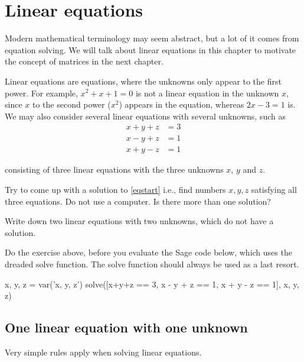 \documentclass{article}
\begin{document}
\chapter{Linear equations}

Modern mathematical terminology may seem abstract, but a lot of it comes from
equation solving. We will talk about linear equations in this chapter to
motivate the concept of matrices in the next chapter.

Linear equations are equations, where the unknowns
only appear to the first power. For example,
$x^2 + x + 1 = 0$ is not a linear equation in the unknown $x$, since $x$ to the second power ($x^2$) appears in the equation,  whereas
$2 x - 3 = 1$ is.
We may also consider several linear equations with several unknowns, such as
\begin{align}
x + y + z &= 3\\
x - y + z &= 1\\ \label{eqstart}
x + y - z &= 1
\end{align}

consisting of three linear equations with the three unknowns $x$, $y$ and $z$.

\beginshex
Try to come up with a solution to \eqref{eqstart} i.e., find
numbers $x, y, z$ satisfying all three equations. Do not use a computer.
Is there more than one solution?

Write down two linear equations with two unknowns, which do not
have a solution.
\endshex

Do the exercise above, before you evaluate the Sage code below, which uses
the dreaded solve function. The solve function should always be used as a last resort.

\begin{sage}
x, y, z = var('x, y, z')
solve([x+y+z == 3, x - y + z == 1, x + y - z == 1],
x, y, z)
\end{sage}



\section{One linear equation with one unknown}

Very simple rules apply when solving linear equations.
\end{document}
